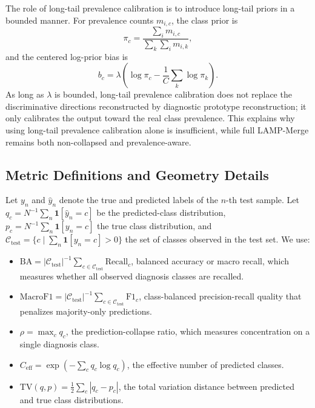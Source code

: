 \documentclass[letterpaper]{article} %
\begin{document}
The role of long-tail prevalence calibration is to introduce long-tail priors in a bounded manner. For prevalence counts $m_{i,c}$, the class prior is
\begin{equation}
\pi_c=\frac{\sum_i m_{i,c}}{\sum_k \sum_i m_{i,k}},
\end{equation}
and the centered log-prior bias is
\begin{equation}
b_c=\lambda\left(\log\pi_c-\frac{1}{C}\sum_k\log\pi_k\right).
\end{equation}
As long as $\lambda$ is bounded, long-tail prevalence calibration does not replace the discriminative directions reconstructed by diagnostic prototype reconstruction; it only calibrates the output toward the real class prevalence. This explains why using long-tail prevalence calibration alone is insufficient, while full LAMP-Merge remains both non-collapsed and prevalence-aware.

\subsection{Metric Definitions and Geometry Details}
\label{app:metric-geometry}

Let \(y_n\) and \(\hat{y}_n\) denote the true and predicted labels of the \(n\)-th test sample. Let \(q_c=N^{-1}\sum_n\mathbf{1}[\hat{y}_n=c]\) be the predicted-class distribution, \(p_c=N^{-1}\sum_n\mathbf{1}[y_n=c]\) the true class distribution, and \(\mathcal{C}_{\mathrm{test}}=\{c\mid \sum_n\mathbf{1}[y_n=c]>0\}\) the set of classes observed in the test set. We use:
\begin{itemize}
\setlength{\itemsep}{0pt}
\item \(\mathrm{BA}=|\mathcal{C}_{\mathrm{test}}|^{-1}\sum_{c\in\mathcal{C}_{\mathrm{test}}}\mathrm{Recall}_c\), balanced accuracy or macro recall, which measures whether all observed diagnosis classes are recalled.
\item \(\mathrm{MacroF1}=|\mathcal{C}_{\mathrm{test}}|^{-1}\sum_{c\in\mathcal{C}_{\mathrm{test}}}\mathrm{F1}_c\), class-balanced precision-recall quality that penalizes majority-only predictions.
\item \(\rho=\max_c q_c\), the prediction-collapse ratio, which measures concentration on a single diagnosis class.
\item \(C_{\mathrm{eff}}=\exp\left(-\sum_c q_c\log q_c\right)\), the effective number of predicted classes.
\item \(\mathrm{TV}(q,p)=\frac{1}{2}\sum_c |q_c-p_c|\), the total variation distance between predicted and true class distributions.
\end{itemize}
\end{document}
